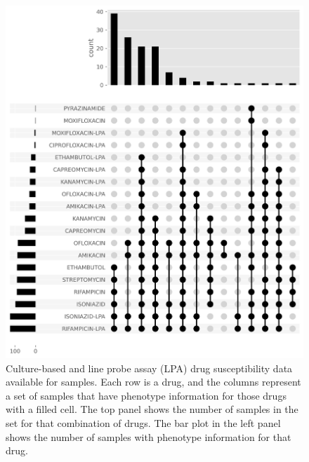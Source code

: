 \begin{figure}
\begin{center}
\includegraphics[width=0.90\columnwidth]{Appendix2/Figs/full-available-dst.png}
\caption{{Culture-based and line probe assay (LPA) drug susceptibility data available for samples. Each row is a drug, and the columns represent a set of samples that have phenotype information for those drugs with a filled cell. The top panel shows the number of samples in the set for that combination of drugs. The bar plot in the left panel shows the number of samples with phenotype information for that drug.
{\label{fig:full-dst}}
}}
\end{center}
\end{figure}